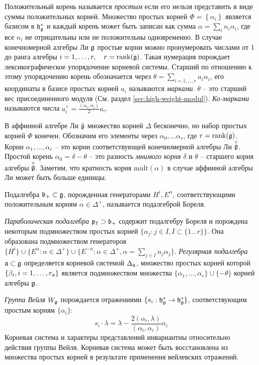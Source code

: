 Положительный корень называется {\it простым} если его нельзя представить в виде суммы положительных корней. Множество простых корней  $\Phi=\left\{\alpha_{i}\right\}$ является базисом в $\mathfrak{h}_{\mathfrak{g}}^{*}$ и каждый корень может быть записан как сумма $\alpha=\sum_{i}n_{i}\alpha_{i}$, где все $n_{i}$ не отрицательны или не положительны одновременно. В случае конечномерной алгебры Ли  $\mathfrak{g}$ простые корни можно пронумеровать числами от  1 до ранга алгебры $i=1,\dots,r,\quad r=\mathrm{rank}(\mathfrak{g})$. Такая нумерация порождает лексикографическое упорядочение корневой системы. Старший по отношению к этому упорядочению корень обозначается через $\theta=\sum_{i=1,\dots,r} a_i \alpha_i$, его координаты в базисе простых корней $a_i$ называются  {\it марками}. $\theta$ -- это старший вес присоединенного модуля (См. раздел \ref{sec:high-weight-modul}). {\it Ко-марками} называются числа $a_i^{\vee}=\frac{(\alpha_i,\alpha_i)}{2} a_i$.

В аффинной алгебре Ли  $\hat{\mathfrak{g}}$ множество корней  $\Delta$ бесконечно, но набор простых корней  $\Phi$ конечен. Обозначим его элементы через $\alpha_{0},\dots \alpha_{r}$, где $r=\mathrm{rank}(\mathfrak{g})$. Корни $\alpha_1,\dots, \alpha_r$ -- это корни соответствующей конечномерной алгебры Ли $\stackrel{\circ }{\mathfrak{g}}$. Простой корень  $\alpha_0=\delta-\theta$ -- это разность  {\it мнимого корня} $\delta$ и $\theta$ -- старшего корня алгебры $\stackrel{\circ }{\mathfrak{g}}$.
Заметим, что кратность корня  $\mathrm{mult}(\alpha)$ в случае аффинной алгебры Ли может быть больше единицы.

Подалгебра  $\mathfrak{b}_{+}\subset \mathfrak{g}$, порожденная генераторами $H^{i}, E^{\alpha}$, соответствующими положительным корням $\alpha\in \Delta^{+}$, называется подалгеброй Бореля.

{\it Параболическая подалгебра}  $\mathfrak{p}_{I}\supset \mathfrak{b}_{+}$ содержит подалгебру Бореля и порождена некоторым подмножеством простых корней  $\{\alpha_{j}:j\in I, I\subset \{1\dots r\}\}$. Она образована подмножеством генераторов  $\{H^{i}\}\cup \{E^{\alpha}:\alpha\in \Delta^{+}\}\cup \{E^{-\alpha}: \alpha\in\Delta^{+}, \alpha=\sum_{j\in I} n_{j} \alpha_{j}\}$.
{\it Регулярная подалгебра} $\mathfrak{a}\subset\mathfrak{g}$ определяется корневой системой  $\Delta_{\mathfrak{a}}$, множество простых корней которой  $\{\beta_{i}, i=1,\dots,r_{\mathfrak{a}}\}$ является подмножеством множества $\{\alpha_{1},\dots,\alpha_{r}\}\cup \{-\theta\}$ корней алгебры $\mathfrak{g}$.

 {\it Группа Вейля} $W_{\mathfrak{g}}$ порождается отражениями $\{s_{i}:\mathfrak{h}_{\mathfrak{g}}^{*}\to\mathfrak{h}_{\mathfrak{g}}^{*}\}$, соответствующим простым корням $\{\alpha_{i}\}$:
\begin{equation}
  \label{eq:117}
  s_{i}\cdot\lambda=\lambda-\frac{2(\alpha_{i},\lambda)}{(\alpha_{i},\alpha_{i})}\alpha_{i}
\end{equation}
Корневая система и характеры представлений инвариантны относительно действия группы Вейля. Корневая система может быть восстановлена из множества простых корней в результате применения вейлевских отражений.

